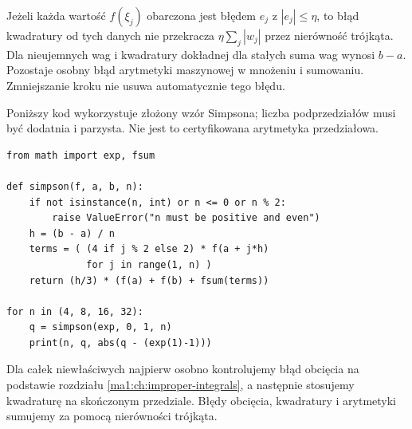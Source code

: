 Jeżeli każda wartość $f(\xi_j)$ obarczona jest błędem $e_j$ z $|e_j|\le\eta$, to błąd kwadratury od tych danych nie przekracza $\eta\sum_j |w_j|$ przez nierówność trójkąta. Dla nieujemnych wag i kwadratury dokładnej dla stałych suma wag wynosi $b-a$. Pozostaje osobny błąd arytmetyki maszynowej w mnożeniu i sumowaniu. Zmniejszanie kroku nie usuwa automatycznie tego błędu.

\begin{przyklad}
\label{ma1:ex:quadrature-python}
Poniższy kod wykorzystuje złożony wzór Simpsona; liczba podprzedziałów musi być dodatnia i parzysta. Nie jest to certyfikowana arytmetyka przedziałowa.
\begin{lstlisting}[style=python]
from math import exp, fsum

def simpson(f, a, b, n):
    if not isinstance(n, int) or n <= 0 or n % 2:
        raise ValueError("n must be positive and even")
    h = (b - a) / n
    terms = ( (4 if j % 2 else 2) * f(a + j*h)
              for j in range(1, n) )
    return (h/3) * (f(a) + f(b) + fsum(terms))

for n in (4, 8, 16, 32):
    q = simpson(exp, 0, 1, n)
    print(n, q, abs(q - (exp(1)-1)))
\end{lstlisting}
\end{przyklad}
Dla całek niewłaściwych najpierw osobno kontrolujemy błąd obcięcia na podstawie rozdziału \ref{ma1:ch:improper-integrals}, a następnie stosujemy kwadraturę na skończonym przedziale. Błędy obcięcia, kwadratury i arytmetyki sumujemy za pomocą nierówności trójkąta.
